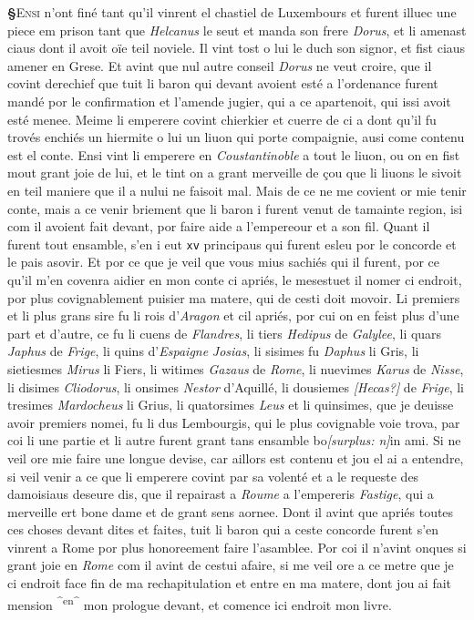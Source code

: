 \documentclass[12pt]{article} %
\newcommand{\persName}[1]{\emph{#1}} %
\newcommand{\placeName}[1]{\emph{#1}} %
\newcommand{\num}[1]{\texttt{#1}}    %
\newcommand{\add}[1]{\textsuperscript{#1}}       %
\newcommand{\supplied}[1]{\textlangle#1\textrangle} %
\newcommand{\uncertain}[1]{\textit{[#1?]}} %
\newcommand{\surplus}[1]{\textit{[surplus: #1]}} %
\newcounter{paranum}
\newcommand{\pnum}{\stepcounter{paranum}\textbf{§\arabic{paranum}}\quad}
\begin{document}
\pnum \lettrine[lines=2]{\color{darkred}E}{nsi} n'ont finé tant qu'il vinre\supplied{n}t el chastiel de Luxe\supplied{m}bours et furent illuec une piece em prison tant que \persName{Helcanus} le seut et manda son frere \persName{Dorus}, et li amenast ciaus dont il avoit oïe teil noviele. Il vint tost o lui le duch son signor, et fist ciaus amener en Grese. Et avint que nul autre conseil \persName{Dorus} ne veut croire, que il covint derechief que tuit li baron qui devant avoient esté a l'ordenance furent mandé por le confirmation et l'amende jugier, qui a ce apartenoit, qui issi avoit esté menee. Meime li emperere covint chierkier et cuerre de ci a dont qu'il fu trovés enchiés un hiermite o lui un liuon qui porte compaignie, ausi come contenu est el conte. Ensi vint li emperere en \placeName{Coustantinoble} a tout le liuon, ou on en fist mout grant joie de lui, et le tint on a grant merveille de çou que li liuons le sivoit en teil maniere que il a nului ne faisoit mal. Mais de ce ne me covient or mie tenir conte, mais a ce venir briement que li baron i furent venut de tamainte region, isi com il avoient fait devant, por faire aide a l'empereour et a son fil. Quant il furent tout ensamble, s'en i eut \num{xv} principaus qui furent esleu por le concorde et le pais asovir. Et por ce que je veil que vous mius sachiés qui il furent, por ce qu'il m'en covenra aidier en mon conte ci apriés, le mesestuet il nomer ci endroit, por plus covignablement puisier ma matere, qui de cesti doit movoir. Li premiers et li plus grans sire fu li rois d'\placeName{Aragon} et cil apriés, por cui on en feist plus d'une part et d'autre, ce fu li cuens de \placeName{Flandres}, li tiers \persName{Hedipus} de \placeName{Galylee}, li quars \persName{Japhus} de \placeName{Frige}, li quins d'\placeName{Espaigne} \persName{Josias}, li sisimes fu \persName{Daphus} li Gris, li sietiesmes \persName{Mirus} li Fiers, li witimes \persName{Gazaus} de \placeName{Rome}, li nuevimes \persName{Karus} de \placeName{Nisse}, li disimes \persName{Cliodorus}, li onsimes \persName{Nestor} d'Aquillé, li dousiemes \uncertain{Hecas} de \placeName{Frige}, li tresimes \persName{Mardocheus} li Grius, li quatorsimes \persName{Leus} et li quinsimes, que je deuisse avoir premiers nomei, fu li dus Lembourgis, qui le plus covignable voie trova, par coi li une partie et li autre furent grant tans ensamble bo\surplus{n}in ami. Si ne veil ore mie faire une longue devise, car aillors est contenu et jou el ai a entendre, si veil venir a ce que li emperere covint par sa volenté et a le requeste des damoisiaus deseure dis, que il repairast a \placeName{Roume} a l'empereris \persName{Fastige}, qui a merveille ert bone dame et de grant se\supplied{n}s aornee. Dont il avint que apriés toutes ces choses devant dites et faites, tuit li baron qui a ceste concorde furent s'en vinrent a Rome por plus honoreement faire l'asamblee. Por coi il n'avint onques si grant joie en \placeName{Rome} com il avint de cestui afaire, si me veil ore a ce metre que je ci endroit face fin de ma rechapitulation et entre en ma matere, dont jou ai fait mension \add{^en^} mon prologue devant, et comence ici endroit mon livre.
\end{document}
